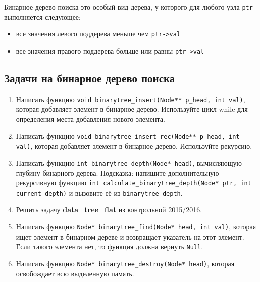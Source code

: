 \documentclass{article}
\begin{document}
Бинарное дерево поиска это особый вид дерева, у которого для любого узла \texttt{ptr} выполняется следующее: 
\begin{itemize}
\item все значения левого поддерева меньше чем \texttt{ptr->val}
\item все значения правого поддерева больше или равны \texttt{ptr->val}
\end{itemize}

\subsection*{Задачи на бинарное дерево поиска}
\begin{enumerate}
\item Написать функцию \texttt{void binarytree\_insert(Node** p\_head, int val)}, которая добавляет элемент в бинарное дерево. Используйте цикл while для определения места добавления нового элемента.
\item Написать функцию \texttt{void binarytree\_insert\_rec(Node** p\_head, int val)}, которая добавляет элемент в бинарное дерево. Используйте рекурсию.
\item Написать функцию \texttt{int binarytree\_depth(Node* head)}, вычисляющую глубину бинарного дерева. Подсказка: напишите дополнительную рекурсивную функцию \texttt{int calculate\_binarytree\_depth(Node* ptr, int current\_depth)} и вызовите её из \texttt{binarytree\_depth}.
\item Решить задачу \textbf{data\_tree\_flat} из контрольной 2015/2016.
\item Написать функцию \texttt{Node* binarytree\_find(Node* head, int val)}, которая ищет элемент в бинарном дереве и возвращает указатель на этот элемент. Если такого элемента нет, то функция должна вернуть \texttt{Null}.
\item Написать функцию \texttt{Node* binarytree\_destroy(Node* head)}, которая освобождает всю выделенную память.
\end{enumerate}
\end{document}
